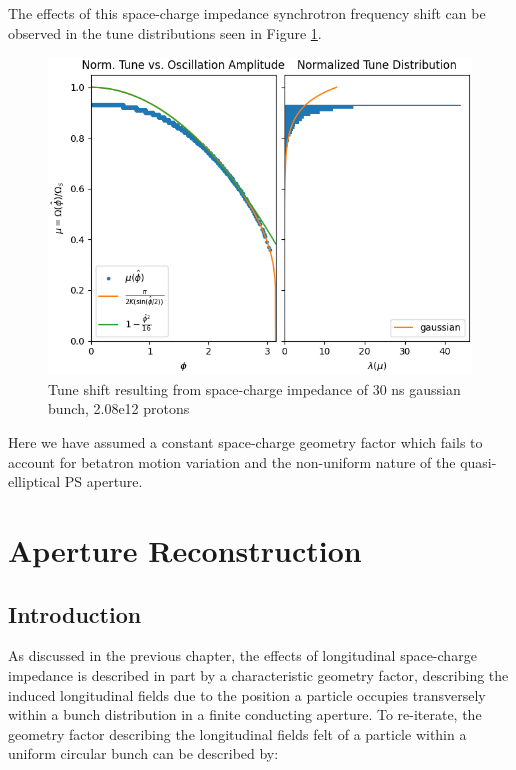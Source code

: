 The effects of this space-charge impedance synchrotron frequency shift can be observed in the tune distributions seen in Figure \ref{fig:tune_shift}.

\begin{figure}
    \centering
    \includegraphics{figs/tune_shift/normalized_tune.png}
    \caption{Tune shift resulting from space-charge impedance of 30 ns gaussian bunch, 2.08e12 protons}
    \label{fig:tune_shift}
\end{figure}

Here we have assumed a constant space-charge geometry factor which fails to account for betatron motion variation and the non-uniform nature of the quasi-elliptical PS aperture.

\chapter{Aperture Reconstruction}

\section{Introduction}

As discussed in the previous chapter, the effects of longitudinal space-charge impedance is described in part by a characteristic geometry factor, describing the induced longitudinal fields due to the position a particle occupies transversely within a bunch distribution in a finite conducting aperture. To re-iterate, the geometry factor describing the longitudinal fields felt of a particle within a uniform circular bunch can be described by:

